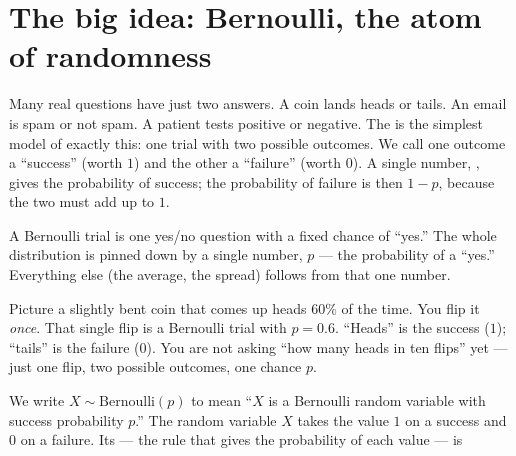 \section{The big idea: Bernoulli, the atom of randomness}

Many real questions have just two answers. A coin lands heads or tails. An email
is spam or not spam. A patient tests positive or negative. The
 is the simplest model of exactly this: one trial
with two possible outcomes. We call one outcome a ``success'' (worth $1$) and the
other a ``failure'' (worth $0$). A single number, , gives the
probability of success; the probability of failure is then $1-p$, because the two
must add up to $1$.

\begin{intuition}
A Bernoulli trial is one yes/no question with a fixed chance of ``yes.'' The whole
distribution is pinned down by a single number, $p$ --- the probability of a
``yes.'' Everything else (the average, the spread) follows from that one number.
\end{intuition}

\begin{everyday}
Picture a slightly bent coin that comes up heads $60\%$ of the time. You flip it
\emph{once}. That single flip is a Bernoulli trial with $p = 0.6$. ``Heads'' is
the success ($1$); ``tails'' is the failure ($0$). You are not asking ``how many
heads in ten flips'' yet --- just one flip, two possible outcomes, one chance $p$.
\end{everyday}

We write $X \sim \text{Bernoulli}(p)$ to mean ``$X$ is a Bernoulli random variable
with success probability $p$.'' The random variable $X$ takes the value $1$ on a
success and $0$ on a failure. Its  --- the
rule that gives the probability of each value --- is

